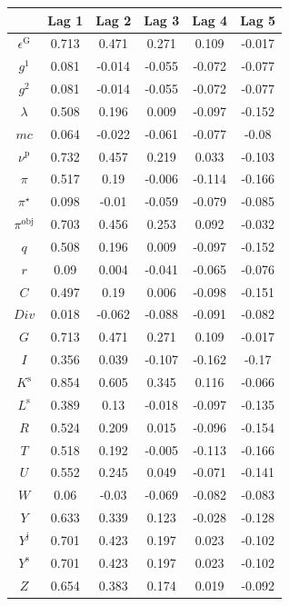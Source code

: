 \begin{tabular}{c|ccccc|}
  & Lag 1 & Lag 2 & Lag 3 & Lag 4 & Lag 5\\
\hline
$\epsilon^{\mathrm{G}}$ & 0.713 & 0.471 & 0.271 & 0.109 & -0.017 \\
$g^{\mathrm{1}}$ & 0.081 & -0.014 & -0.055 & -0.072 & -0.077 \\
$g^{\mathrm{2}}$ & 0.081 & -0.014 & -0.055 & -0.072 & -0.077 \\
$\lambda$ & 0.508 & 0.196 & 0.009 & -0.097 & -0.152 \\
${m\!c}$ & 0.064 & -0.022 & -0.061 & -0.077 & -0.08 \\
$\nu^{\mathrm{p}}$ & 0.732 & 0.457 & 0.219 & 0.033 & -0.103 \\
$\pi$ & 0.517 & 0.19 & -0.006 & -0.114 & -0.166 \\
$\pi^{\star}$ & 0.098 & -0.01 & -0.059 & -0.079 & -0.085 \\
$\pi^{\mathrm{obj}}$ & 0.703 & 0.456 & 0.253 & 0.092 & -0.032 \\
$q$ & 0.508 & 0.196 & 0.009 & -0.097 & -0.152 \\
$r$ & 0.09 & 0.004 & -0.041 & -0.065 & -0.076 \\
$C$ & 0.497 & 0.19 & 0.006 & -0.098 & -0.151 \\
${D\!i\!v}$ & 0.018 & -0.062 & -0.088 & -0.091 & -0.082 \\
$G$ & 0.713 & 0.471 & 0.271 & 0.109 & -0.017 \\
$I$ & 0.356 & 0.039 & -0.107 & -0.162 & -0.17 \\
$K^{\mathrm{s}}$ & 0.854 & 0.605 & 0.345 & 0.116 & -0.066 \\
$L^{\mathrm{s}}$ & 0.389 & 0.13 & -0.018 & -0.097 & -0.135 \\
$R$ & 0.524 & 0.209 & 0.015 & -0.096 & -0.154 \\
$T$ & 0.518 & 0.192 & -0.005 & -0.113 & -0.166 \\
$U$ & 0.552 & 0.245 & 0.049 & -0.071 & -0.141 \\
$W$ & 0.06 & -0.03 & -0.069 & -0.082 & -0.083 \\
$Y$ & 0.633 & 0.339 & 0.123 & -0.028 & -0.128 \\
$Y^{\mathrm{j}}$ & 0.701 & 0.423 & 0.197 & 0.023 & -0.102 \\
$Y^{\mathrm{s}}$ & 0.701 & 0.423 & 0.197 & 0.023 & -0.102 \\
$Z$ & 0.654 & 0.383 & 0.174 & 0.019 & -0.092 \\
\hline
\end{tabular}



